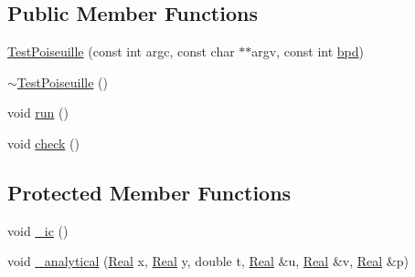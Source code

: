 \subsection*{Public Member Functions}
\begin{DoxyCompactItemize}
\item 
\hyperlink{class_test_poiseuille_acc5d21b6eaa9d588e69ffb44e58878b2}{Test\+Poiseuille} (const int argc, const char $\ast$$\ast$argv, const int \hyperlink{class_test_poiseuille_a368bcc1b6b25f4fde19cbfdb606403d9}{bpd})
\item 
\hyperlink{class_test_poiseuille_a24f45355d1eff8226038535c18f6955e}{$\sim$\+Test\+Poiseuille} ()
\item 
void \hyperlink{class_test_poiseuille_a510e8d1aba9e36232f0b2ab8fffad3db}{run} ()
\item 
void \hyperlink{class_test_poiseuille_a0d5dfd145ed9ae7572a85cec7fd4cad6}{check} ()
\end{DoxyCompactItemize}
\subsection*{Protected Member Functions}
\begin{DoxyCompactItemize}
\item 
void \hyperlink{class_test_poiseuille_a2fd7adc148b6f98410facf04bd928bcf}{\+\_\+ic} ()
\item 
void \hyperlink{class_test_poiseuille_a3c718e2a5685309f50b1c7260eac3f81}{\+\_\+analytical} (\hyperlink{_h_d_f5_dumper_8h_a445a5f0e2a34c9d97d69a3c2d1957907}{Real} x, \hyperlink{_h_d_f5_dumper_8h_a445a5f0e2a34c9d97d69a3c2d1957907}{Real} y, double t, \hyperlink{_h_d_f5_dumper_8h_a445a5f0e2a34c9d97d69a3c2d1957907}{Real} \&u, \hyperlink{_h_d_f5_dumper_8h_a445a5f0e2a34c9d97d69a3c2d1957907}{Real} \&v, \hyperlink{_h_d_f5_dumper_8h_a445a5f0e2a34c9d97d69a3c2d1957907}{Real} \&p)
\end{DoxyCompactItemize}
